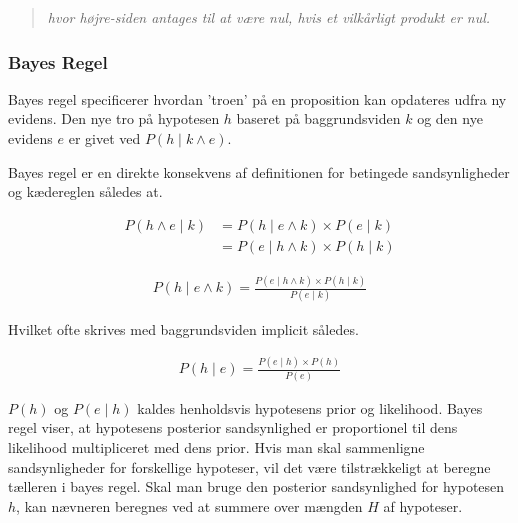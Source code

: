 \begin{quotation}
	\textit{hvor højre-siden antages til at være nul, hvis et vilkårligt produkt er nul.}
\end{quotation}

\cite[s. 227]{ArtificialIntelligence}

\subsubsection{Bayes Regel}

Bayes regel specificerer hvordan 'troen' på en proposition kan opdateres udfra ny evidens.
Den nye tro på hypotesen $h$ baseret på baggrundsviden $k$ og den nye evidens $e$ er givet ved $P(h \mid k \wedge e)$.

Bayes regel er en direkte konsekvens af definitionen for betingede sandsynligheder og kædereglen således at. 

\begin{equation}
\begin{split}
P(h \wedge e \mid k) &= P(h \mid e \wedge k) \times P(e \mid k) \\
&= P(e \mid h \wedge k) \times P(h \mid k)
\end{split}
\end{equation}

\begin{equation}
\begin{split}
P(h \mid e \wedge k) = \frac{P(e \mid h \wedge k) \times P(h \mid k)}{P(e \mid k)}
\end{split}
\end{equation}

Hvilket ofte skrives med baggrundsviden implicit således.

\begin{equation}
\begin{split}
P(h \mid e) = \frac{P(e \mid h) \times P(h)}{P(e)}
\end{split}
\end{equation}

$P(h)$ og $P(e \mid h)$ kaldes henholdsvis hypotesens prior og likelihood.
Bayes regel viser, at hypotesens posterior sandsynlighed er proportionel til dens likelihood multipliceret med dens prior.
Hvis man skal sammenligne sandsynligheder for forskellige hypoteser, vil det være tilstrækkeligt at beregne tælleren i bayes regel.
Skal man bruge den posterior sandsynlighed for hypotesen $h$, kan nævneren beregnes ved at summere over mængden $H$ af hypoteser.

